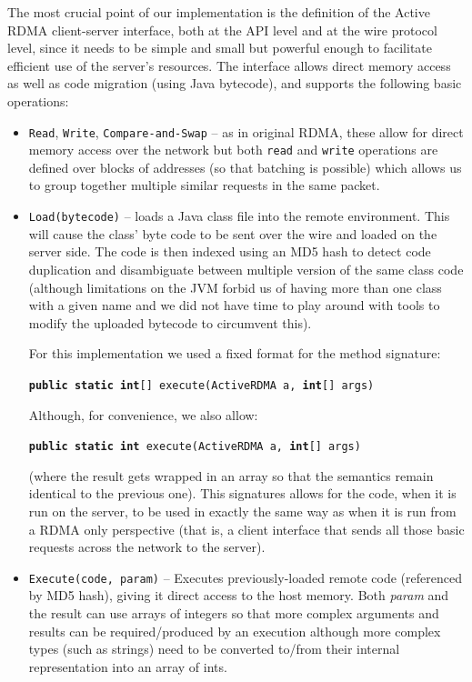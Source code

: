 \documentclass[10pt]{article}
\begin{document}
The most crucial point of our implementation is the definition of the Active RDMA client-server interface, both at the API level and at the wire protocol level, since it needs to be simple and small but powerful enough to facilitate efficient use of the server's resources. The interface allows direct memory
  access as well as code migration (using Java bytecode), and supports
  the following basic operations:
  \begin{itemize}
  \item {\tt Read}, {\tt Write}, {\tt Compare-and-Swap} -- as in original RDMA, these
    allow for direct memory access over the network but both {\tt read}
    and {\tt write} operations are defined over blocks of addresses (so
    that batching is possible) which allows us to group together multiple similar requests in the same packet.
  \item {\tt Load(bytecode)} -- loads a Java class file into the remote
    environment. This will cause the class' byte code to be sent over the wire and loaded on the server side. The code is then indexed using an MD5 hash to detect code duplication and disambiguate between multiple version of the same class code (although limitations on the JVM forbid us of having more than one class with a given name and we did not have time to play around with tools to modify the uploaded bytecode to circumvent this). 
    
    For this implementation we used a fixed format for the method signature:
    
    {\tt \textbf{public static int}[] execute(ActiveRDMA a, \textbf{int}[] args)}

Although, for convenience, we also allow:

    {\tt \textbf{public static int} execute(ActiveRDMA a, \textbf{int}[] args)}

(where the result gets wrapped in an array so that the semantics remain identical to the previous one). This signatures allows for the code, when it is run on the server, to be used in exactly the same way as when it is run from a RDMA only perspective (that is, a client interface that sends all those basic requests across the network to the server). 

  \item {\tt Execute(code, param)} -- Executes previously-loaded remote code
    (referenced by MD5 hash), giving it direct access to the host
    memory. Both \textit{param} and the result can use arrays of integers so that more complex arguments and results can be required/produced by an execution although more complex types (such as strings) need to be converted to/from their internal representation into an array of ints.
     
  \end{itemize}
  
\end{document}
